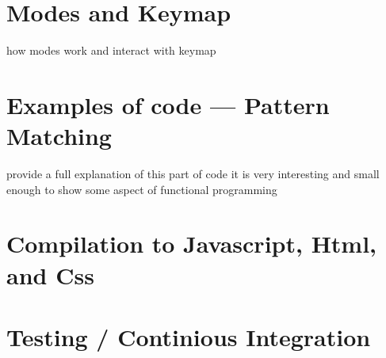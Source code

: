 \documentclass[master.tex]{subfiles}
\begin{document}
\section{Modes and Keymap}
  how modes work and interact with keymap
\section{Examples of code --- Pattern Matching}
provide a full explanation of this part of code it is very interesting and small
enough to show some aspect of functional programming
\section{Compilation to Javascript, Html, and Css}
\section{Testing / Continious Integration}





\end{document}
